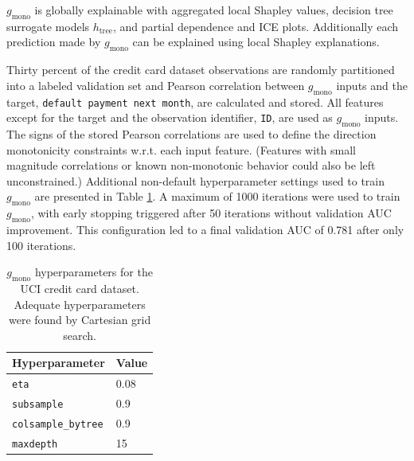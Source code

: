 \documentclass[sigconf, review]{acmart}
\begin{document}
\noindent$g_{\text{mono}}$ is globally explainable with aggregated local Shapley values, decision tree surrogate models $h_{\text{tree}}$, and partial dependence and ICE plots. Additionally each prediction made by $g_{\text{mono}}$ can be explained using local Shapley explanations. 

Thirty percent of the credit card dataset observations are randomly partitioned into a labeled validation set and Pearson correlation between $g_{\text{mono}}$ inputs and the target, \texttt{default payment next month}, are calculated and stored. All features except for the target and the observation identifier, \texttt{ID}, are used as $g_{\text{mono}}$ inputs. The signs of the stored Pearson correlations are used to define the direction monotonicity constraints w.r.t. each input feature. (Features with small magnitude correlations or known non-monotonic behavior could also be left unconstrained.) Additional non-default hyperparameter settings used to train $g_{\text{mono}}$ are presented in Table \ref{tab:mono_gbm}. A maximum of 1000 iterations were used to train $g_{\text{mono}}$, with early stopping triggered after 50 iterations without validation AUC improvement. This configuration led to a final validation AUC of 0.781 after only 100 iterations. 

\begin{table}[ht]
	\centering
	\caption{$g_{\text{mono}}$ hyperparameters for the UCI credit card dataset. Adequate hyperparameters were found by Cartesian grid search.}
	\begin{tabular}{ | p{3.5cm} | p{1.2cm} | }
	\hline
	Hyperparameter & Value \\ 
	\hline
	\texttt{eta} & 0.08 \\
	\hline	
	\texttt{subsample} & 0.9 \\
	\hline	
	\texttt{colsample\_bytree} & 0.9 \\
	\hline
	\texttt{maxdepth} & 15 \\	
	\hline
	\end{tabular}
	\label{tab:mono_gbm}
\end{table}	 
\end{document}
